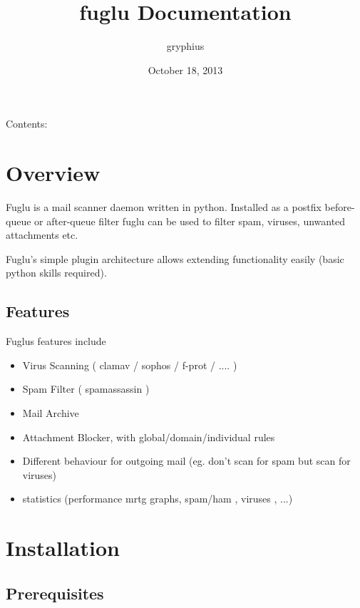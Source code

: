\documentclass[letterpaper,10pt,english]{sphinxmanual}
\title{fuglu Documentation}
\date{October 18, 2013}
\author{gryphius}
\begin{document}
\maketitle
\tableofcontents
{}\label{index::doc}


Contents:


\chapter{Overview}
\label{overview-index:overview}\label{overview-index:fuglu-mail-content-scanner}\label{overview-index::doc}
Fuglu is a mail scanner daemon written in python. Installed as a postfix before-queue or after-queue filter fuglu can be used to filter spam, viruses, unwanted attachments etc.

Fuglu's simple plugin architecture allows extending functionality easily (basic python skills required).


\section{Features}
\label{overview-index:features}
Fuglus features include
\begin{itemize}
\item {} 
Virus Scanning ( clamav / sophos / f-prot / .... )

\item {} 
Spam Filter ( spamassassin )

\item {} 
Mail Archive

\item {} 
Attachment Blocker, with global/domain/individual rules

\item {} 
Different behaviour for outgoing mail (eg. don't scan for spam but scan for viruses)

\item {} 
statistics (performance mrtg graphs, spam/ham , viruses , ...)

\end{itemize}


\chapter{Installation}
\label{installation-index:installation}\label{installation-index::doc}

\section{Prerequisites}
\label{installation-index:prerequisites}
\end{document}
